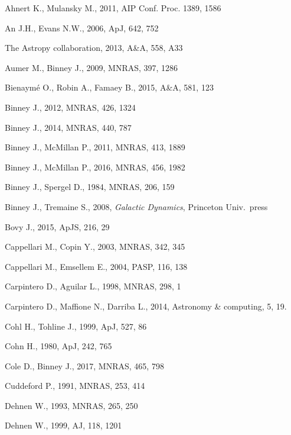 \documentclass[12pt]{article}
\begin{document}
\begin{thebibliography}{99} \setlength{\parskip}{2pt} \setlength{\itemsep}{2pt}

Ahnert K., Mulansky M., 2011, AIP Conf. Proc. 1389, 1586

An J.H., Evans N.W., 2006, ApJ, 642, 752

The Astropy collaboration, 2013, A\&A, 558, A33

Aumer M., Binney J., 2009, MNRAS, 397, 1286

Bienaym\'e O., Robin A., Famaey B., 2015, A\&A, 581, 123

Binney J., 2012, MNRAS, 426, 1324

Binney J., 2014, MNRAS, 440, 787

Binney J., McMillan P., 2011, MNRAS, 413, 1889

Binney J., McMillan P., 2016, MNRAS, 456, 1982

Binney J., Spergel D., 1984, MNRAS, 206, 159

Binney J., Tremaine S., 2008, \textsl{Galactic Dynamics}, Princeton Univ.\ press

Bovy J., 2015, ApJS, 216, 29

Cappellari M., Copin Y., 2003, MNRAS, 342, 345

Cappellari M., Emsellem E., 2004, PASP, 116, 138

Carpintero D., Aguilar L., 1998, MNRAS, 298, 1

Carpintero D., Maffione N., Darriba L., 2014, Astronomy \& computing, 5, 19.

Cohl H., Tohline J., 1999, ApJ, 527, 86

Cohn H., 1980, ApJ, 242, 765

Cole D., Binney J., 2017, MNRAS, 465, 798

Cuddeford P., 1991, MNRAS, 253, 414

Dehnen W., 1993, MNRAS, 265, 250

Dehnen W., 1999, AJ, 118, 1201


\end{thebibliography}
\end{document}
